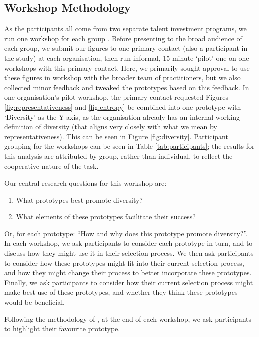 \subsection{Workshop Methodology}\label{ssec:methods2}
As the participants all come from two separate talent investment programs, we run one workshop for each group \cite{Buchenau_Suri_2000}. Before presenting to the broad audience of each group, we submit our figures to one primary contact (also a participant in the study) at each organisation, then run informal, 15-minute `pilot' one-on-one workshops with this primary contact. Here, we primarily sought approval to use these figures in workshop with the broader team of practitioners, but we also collected minor feedback and tweaked the prototypes based on this feedback. In one organisation's pilot workshop, the primary contact requested Figures \ref{fig:representativeness} and \ref{fig:entropy} be combined into one prototype with `Diversity' as the Y-axis, as the organisation already has an internal working definition of diversity (that aligns very closely with what we mean by representativeness). This can be seen in Figure \ref{fig:diversity}. Participant grouping for the workshops can be seen in Table \ref{tab:participants}; the results for this analysis are attributed by group, rather than individual, to reflect the cooperative nature of the task.

Our central research questions for this workshop are:

\begin{enumerate}
    \item What prototypes best promote diversity?
    \item What elements of these prototypes facilitate their success?
\end{enumerate}

\noindent Or, for each prototype: ``How and why does this prototype promote diversity?''. In each workshop, we ask participants to consider each prototype in turn, and to discuss how they might use it in their selection process. We then ask participants to consider how these prototypes might fit into their current selection process, and how they might change their process to better incorporate these prototypes. Finally, we ask participants to consider how their current selection process might make best use of these prototypes, and whether they think these prototypes would be beneficial. 

Following the methodology of \textcite{Gatian_1994,Griffiths_Johnson_Hartley_2007}, at the end of each workshop, we ask participants to highlight their favourite prototype.


